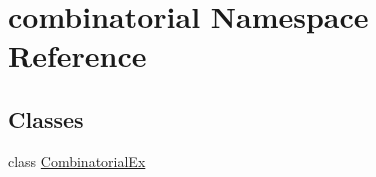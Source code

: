 \hypertarget{namespacecombinatorial}{\section{combinatorial Namespace Reference}
\label{namespacecombinatorial}
}
\subsection*{Classes}
\begin{DoxyCompactItemize}
\item 
class \hyperlink{classcombinatorial_1_1CombinatorialEx}{Combinatorial\-Ex}
\end{DoxyCompactItemize}
